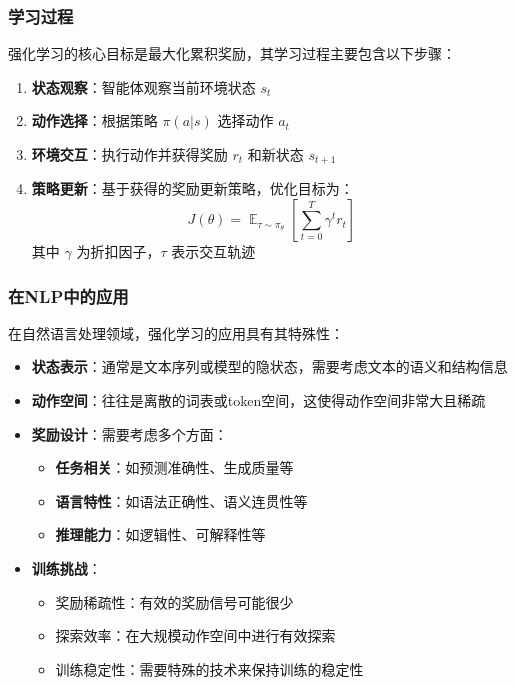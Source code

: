 \documentclass[a4paper, 12pt]{article}
\DeclareMathOperator*{\E}{\mathbb{E}}    %
\begin{document}
\subsubsection{学习过程}
强化学习的核心目标是最大化累积奖励，其学习过程主要包含以下步骤：

\begin{enumerate}
    \item \textbf{状态观察}：智能体观察当前环境状态 $s_t$
    \item \textbf{动作选择}：根据策略 $\pi(a|s)$ 选择动作 $a_t$
    \item \textbf{环境交互}：执行动作并获得奖励 $r_t$ 和新状态 $s_{t+1}$
    \item \textbf{策略更新}：基于获得的奖励更新策略，优化目标为：
        \begin{equation}
            J(\theta) = \E_{\tau \sim \pi_\theta}[\sum_{t=0}^{T} \gamma^t r_t]
        \end{equation}
        其中 $\gamma$ 为折扣因子，$\tau$ 表示交互轨迹
\end{enumerate}

\subsubsection{在NLP中的应用}
在自然语言处理领域，强化学习的应用具有其特殊性：
\begin{itemize}
    \item \textbf{状态表示}：通常是文本序列或模型的隐状态，需要考虑文本的语义和结构信息
    \item \textbf{动作空间}：往往是离散的词表或token空间，这使得动作空间非常大且稀疏
    \item \textbf{奖励设计}：需要考虑多个方面：
        \begin{itemize}
            \item \textbf{任务相关}：如预测准确性、生成质量等
            \item \textbf{语言特性}：如语法正确性、语义连贯性等
            \item \textbf{推理能力}：如逻辑性、可解释性等
        \end{itemize}
    \item \textbf{训练挑战}：
        \begin{itemize}
            \item 奖励稀疏性：有效的奖励信号可能很少
            \item 探索效率：在大规模动作空间中进行有效探索
            \item 训练稳定性：需要特殊的技术来保持训练的稳定性
        \end{itemize}
\end{itemize}
\end{document}
